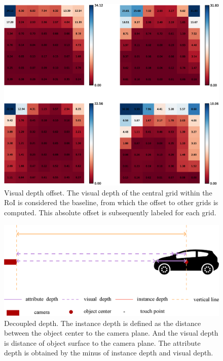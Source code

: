 \documentclass[journal]{IEEEtran}
\begin{document}
	\begin{figure}[!t]
		\centering
		\includegraphics[width=1.0\linewidth]{Figures/visual_depth_offset/visual_depth_offset.eps}
		\caption{Visual depth offset. The visual depth of the central grid within the RoI is considered the baseline, from which the offset to other grids is computed. This absolute offset is subsequently labeled for each grid.}
		\label{fig:visual_depth_offset}
	\end{figure}
	\begin{figure}[!t]
		\centering
		\includegraphics[width=1.0\linewidth]{Figures/decoupled_depth_fig/decoupled_depth.eps}
		\caption{Decoupled depth. The instance depth is defined as the distance between the object center to the camera plane. And the visual depth is distance of object surface to the camera plane. The attribute depth is obtained by the minus of instance depth and visual depth.}
		\label{fig:decoupled depth}
	\end{figure}
\end{document}
